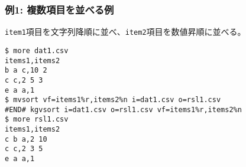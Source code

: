 \subsubsection*{例1: 複数項目を並べる例}

\verb|item1|項目を文字列降順に並べ、\verb|item2|項目を数値昇順に並べる。


\begin{Verbatim}[baselinestretch=0.7,frame=single]
$ more dat1.csv
items1,items2
b a c,10 2
c c,2 5 3
e a a,1
$ mvsort vf=items1%r,items2%n i=dat1.csv o=rsl1.csv
#END# kgvsort i=dat1.csv o=rsl1.csv vf=items1%r,items2%n
$ more rsl1.csv
items1,items2
c b a,2 10
c c,2 3 5
e a a,1
\end{Verbatim}
